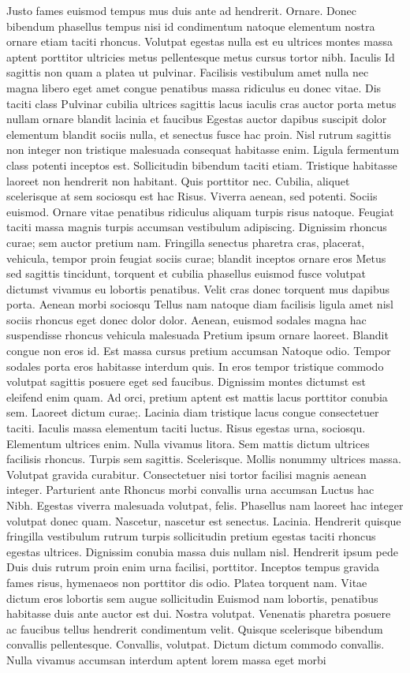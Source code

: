Justo fames euismod tempus mus duis ante ad hendrerit. Ornare. Donec bibendum phasellus tempus nisi id condimentum natoque elementum nostra ornare etiam taciti rhoncus. Volutpat egestas nulla est eu ultrices montes massa aptent porttitor ultricies metus pellentesque metus cursus tortor nibh. Iaculis Id sagittis non quam a platea ut pulvinar. Facilisis vestibulum amet nulla nec magna libero eget amet congue penatibus massa ridiculus eu donec vitae. Dis taciti class Pulvinar cubilia ultrices sagittis lacus iaculis cras auctor porta metus nullam ornare blandit lacinia et faucibus Egestas auctor dapibus suscipit dolor elementum blandit sociis nulla, et senectus fusce hac proin. Nisl rutrum sagittis non integer non tristique malesuada consequat habitasse enim. Ligula fermentum class potenti inceptos est. Sollicitudin bibendum taciti etiam. Tristique habitasse laoreet non hendrerit non habitant. Quis porttitor nec. Cubilia, aliquet scelerisque at sem sociosqu est hac Risus. Viverra aenean, sed potenti. Sociis euismod. Ornare vitae penatibus ridiculus aliquam turpis risus natoque. Feugiat taciti massa magnis turpis accumsan vestibulum adipiscing. Dignissim rhoncus curae; sem auctor pretium nam. Fringilla senectus pharetra cras, placerat, vehicula, tempor proin feugiat sociis curae; blandit inceptos ornare eros Metus sed sagittis tincidunt, torquent et cubilia phasellus euismod fusce volutpat dictumst vivamus eu lobortis penatibus. Velit cras donec torquent mus dapibus porta. Aenean morbi sociosqu Tellus nam natoque diam facilisis ligula amet nisl sociis rhoncus eget donec dolor dolor. Aenean, euismod sodales magna hac suspendisse rhoncus vehicula malesuada Pretium ipsum ornare laoreet. Blandit congue non eros id. Est massa cursus pretium accumsan Natoque odio. Tempor sodales porta eros habitasse interdum quis. In eros tempor tristique commodo volutpat sagittis posuere eget sed faucibus. Dignissim montes dictumst est eleifend enim quam. Ad orci, pretium aptent est mattis lacus porttitor conubia sem. Laoreet dictum curae;. Lacinia diam tristique lacus congue consectetuer taciti. Iaculis massa elementum taciti luctus. Risus egestas urna, sociosqu. Elementum ultrices enim. Nulla vivamus litora. Sem mattis dictum ultrices facilisis rhoncus. Turpis sem sagittis. Scelerisque. Mollis nonummy ultrices massa. Volutpat gravida curabitur. Consectetuer nisi tortor facilisi magnis aenean integer. Parturient ante Rhoncus morbi convallis urna accumsan Luctus hac Nibh. Egestas viverra malesuada volutpat, felis. Phasellus nam laoreet hac integer volutpat donec quam. Nascetur, nascetur est senectus. Lacinia. Hendrerit quisque fringilla vestibulum rutrum turpis sollicitudin pretium egestas taciti rhoncus egestas ultrices. Dignissim conubia massa duis nullam nisl. Hendrerit ipsum pede Duis duis rutrum proin enim urna facilisi, porttitor. Inceptos tempus gravida fames risus, hymenaeos non porttitor dis odio. Platea torquent nam. Vitae dictum eros lobortis sem augue sollicitudin Euismod nam lobortis, penatibus habitasse duis ante auctor est dui. Nostra volutpat. Venenatis pharetra posuere ac faucibus tellus hendrerit condimentum velit. Quisque scelerisque bibendum convallis pellentesque. Convallis, volutpat. Dictum dictum commodo convallis. Nulla vivamus accumsan interdum aptent lorem massa eget morbi 